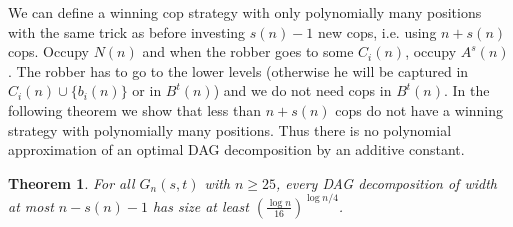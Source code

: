 \documentclass[authoryear]{article}
\makeatletter
\newtheorem{theorem}{Theorem}
\theoremstyle{definition}
\newcommand{\0}{\emptyset}
\newcommand{\ie}{i.e.\@\xspace}
\makeatother
\begin{document}
We can define a winning cop strategy with only
polynomially many positions with the same trick as before investing
$s(n)-1$ new cops, \ie using $n+s(n)$ cops. Occupy $N(n)$ and when the
robber goes to some $C_i(n)$, occupy $A^s(n)$. The robber has to go to
the lower levels (otherwise he will be captured in
$C_i(n)\cup\{b_i(n)\}$ or in $B^t(n)$) and we do not need cops in
$B^t(n)$. In the following theorem we show that less than $n+s(n)$ cops
do not have a winning strategy with polynomially many positions. Thus
there is no polynomial approximation of an optimal DAG decomposition
by an additive constant.

\begin{theorem}
  For all $G_n(s,t)$ with $n\ge 25$, every DAG decomposition of width at most $n-s(n)-1$
  has size at least $\left(\frac{\log n}{16}\right)^{\log n/4}$.
\end{theorem}
\end{document}
